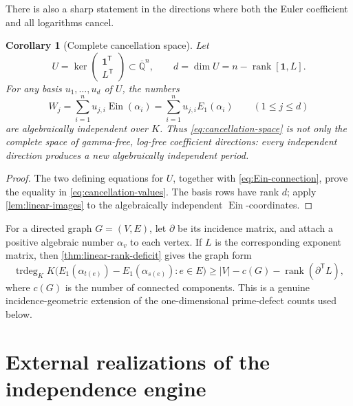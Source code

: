 \documentclass[11pt]{article}
\theoremstyle{keio}
\newtheorem{corollary}[theorem]{Corollary}
\theoremstyle{definition}
\theoremstyle{remark}
\newcommand{\Qbar}{\overline{\mathbb Q}}
\newcommand{\Ein}{\operatorname{Ein}}
\newcommand{\trdeg}{\operatorname{trdeg}}
\begin{document}
There is also a sharp statement in the directions where both the Euler
coefficient and all logarithms cancel.

\begin{corollary}[Complete cancellation space]
\label{cor:complete-cancellation-space}
Let
\begin{equation}\label{eq:cancellation-space}
 U=\ker\begin{pmatrix}\mathbf1^{\mathsf T}\\L^{\mathsf T}\end{pmatrix}
 \subset\Qbar^n,
 \qquad
 d=\dim U=n-\operatorname{rank}[\mathbf1,L].
\end{equation}
For any basis \(u_1,\ldots,u_d\) of \(U\), the numbers
\begin{equation}\label{eq:cancellation-values}
 W_j=\sum_{i=1}^n u_{j,i}\Ein(\alpha_i)
     =\sum_{i=1}^n u_{j,i}E_1(\alpha_i)
 \qquad(1\le j\le d)
\end{equation}
are algebraically independent over \(K\).  Thus
\eqref{eq:cancellation-space} is not only the complete space of
gamma-free, log-free coefficient directions: every independent direction
produces a new algebraically independent period.
\end{corollary}

\begin{proof}
The two defining equations for \(U\), together with
\eqref{eq:Ein-connection}, prove the equality in
\eqref{eq:cancellation-values}.  The basis rows have rank \(d\); apply
\cref{lem:linear-images} to the algebraically independent \(\Ein\)-coordinates.
\end{proof}

For a directed graph \(G=(V,E)\), let \(\partial\) be its incidence matrix,
and attach a positive algebraic number \(\alpha_v\) to each vertex.  If
\(L\) is the corresponding exponent matrix, then
\cref{thm:linear-rank-deficit} gives the graph form
\begin{equation}\label{eq:graph-rank-deficit}
 \trdeg_KK\bigl(E_1(\alpha_{t(e)})-E_1(\alpha_{s(e)}):e\in E\bigr)
 \ge |V|-c(G)-\operatorname{rank}(\partial^{\mathsf T}L),
\end{equation}
where \(c(G)\) is the number of connected components.  This is a genuine
incidence-geometric extension of the one-dimensional prime-defect counts
used below.

\section{External realizations of the independence engine}
\label{sec:external-realizations}
\end{document}
